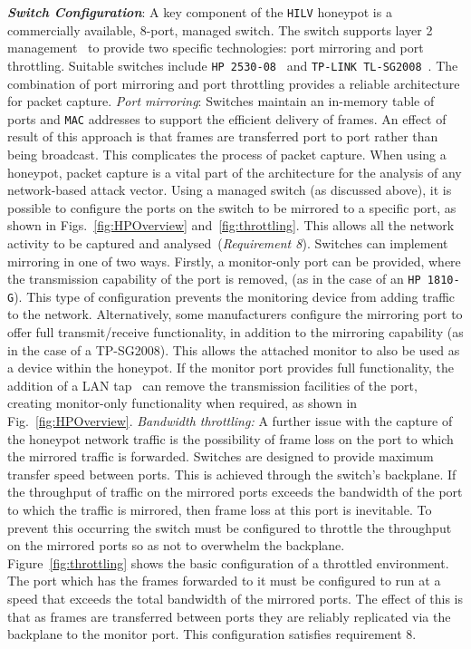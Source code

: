 \documentclass[10pt,journal]{IEEEtran}
\begin{document}
\noindent\textit{\textbf{Switch Configuration}}:
A key component of the \texttt{HILV} honeypot is a commercially available,
8-port, managed switch. The switch supports layer 2 management~\cite{ST:98} to
provide two specific technologies: port mirroring and port throttling. Suitable
switches include \texttt{HP 2530-08}~\cite{HP:17} and \texttt{TP-LINK TL-SG2008}~\cite{TP:17}.
The combination of port mirroring and port throttling provides a reliable architecture
for packet capture. 
\newline\newline
\noindent\emph{Port mirroring}:
Switches maintain an in-memory table of ports and \texttt{MAC} addresses to
support the efficient delivery of frames. An effect of result of this approach
is that frames are transferred port to port rather than being broadcast. This
complicates the process of packet capture. When using a honeypot, packet
capture is a vital part of the architecture for the analysis of any
network-based attack vector. Using a managed switch (as discussed above), it is
possible to configure the ports on the switch to be mirrored to a specific
port, as shown in Figs.~\ref{fig:HPOverview} and~\ref{fig:throttling}. This
allows all the network activity to be captured and analysed~(\emph{Requirement
8}). Switches can implement mirroring in one of two ways. Firstly, a monitor-only
port can be provided, where the transmission capability of the port is removed,
(as in the case of an \texttt{HP 1810-G}). This type of configuration prevents the
monitoring device from adding traffic to the network. Alternatively, some
manufacturers configure the mirroring port to offer full transmit/receive
functionality, in addition to the mirroring capability (as in the case of a
TP-SG2008). This allows the attached monitor to also be used as a device within
the honeypot. If the monitor port provides full functionality, the addition of
a LAN tap~\cite{RB:13} can remove the transmission facilities of the port,
creating monitor-only functionality when required, as shown in
Fig.~\ref{fig:HPOverview}.
\newline\newline
\noindent\emph{Bandwidth throttling:}
A further issue with the capture of the honeypot network traffic is the
possibility of frame loss on the port to which the mirrored traffic is
forwarded.  Switches are designed to provide maximum transfer speed between
ports. This is achieved through the switch's backplane. If the throughput of
traffic on the mirrored ports exceeds the bandwidth of the port to which the
traffic is mirrored, then frame loss at this port is inevitable. To prevent
this occurring the switch must be configured to throttle the throughput on the
mirrored ports so as not to overwhelm the backplane.
Figure~\ref{fig:throttling} shows the basic configuration of a throttled
environment. The port which has the frames forwarded to it must be configured
to run at a speed that exceeds the total bandwidth of the mirrored ports. The
effect of this is that as frames are transferred between ports they are
reliably replicated via the backplane to the monitor port. This configuration
satisfies requirement 8.
\end{document}
